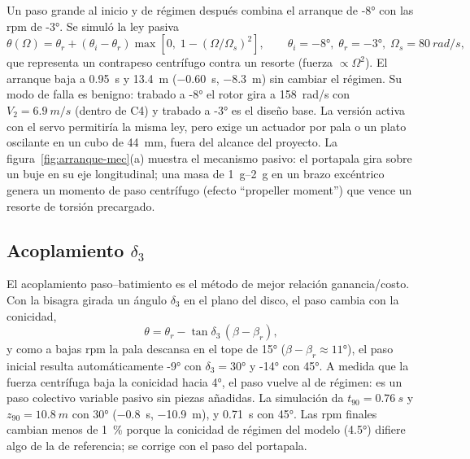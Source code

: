 Un paso grande al inicio y de régimen después combina el arranque de \ang{-8} con las rpm de
\ang{-3}. Se simuló la ley pasiva
\begin{equation}
  \theta(\Omega)=\theta_r+(\theta_i-\theta_r)\max\!\left[0,\;1-(\Omega/\Omega_s)^2\right],
  \qquad \theta_i=\ang{-8},\;\theta_r=\ang{-3},\;\Omega_s=\SI{80}{rad/s},
  \label{eq:arranque-var}
\end{equation}
que representa un contrapeso centrífugo contra un resorte (fuerza $\propto\Omega^2$). El
arranque baja a \SI{0.95}{s} y \SI{13.4}{m} (\SI{-0.60}{s}, \SI{-8.3}{m}) sin cambiar el
régimen. Su modo de falla es benigno: trabado a \ang{-8} el rotor gira a \SI{158}{rad/s} con
$V_2=\SI{6.9}{m/s}$ (dentro de C4) y trabado a \ang{-3} es el diseño base. La versión activa
con el servo permitiría la misma ley, pero exige un actuador por pala o un plato oscilante en
un cubo de \SI{44}{mm}, fuera del alcance del proyecto. La figura~\ref{fig:arranque-mec}(a)
muestra el mecanismo pasivo: el portapala gira sobre un buje en su eje longitudinal; una
masa de \SIrange{1}{2}{g} en un brazo excéntrico genera un momento de paso centrífugo
(efecto ``propeller moment'') que vence un resorte de torsión precargado.

\subsection{Acoplamiento \texorpdfstring{$\delta_3$}{delta-3}}\label{sec:arranque-d3}

El acoplamiento paso--batimiento es el método de mejor relación ganancia/costo. Con la bisagra
girada un ángulo $\delta_3$ en el plano del disco, el paso cambia con la conicidad,
\begin{equation}
  \theta=\theta_r-\tan\delta_3\,(\beta-\beta_r),
  \label{eq:arranque-d3}
\end{equation}
y como a bajas rpm la pala descansa en el tope de \ang{15} ($\beta-\beta_r\approx\ang{11}$), el
paso inicial resulta automáticamente \ang{-9} con $\delta_3=\ang{30}$ y \ang{-14} con
\ang{45}. A medida que la fuerza centrífuga baja la conicidad hacia \ang{4}, el paso vuelve
al de régimen: es un paso colectivo variable pasivo sin piezas añadidas. La simulación da
$t_{90}=\SI{0.76}{s}$ y $z_{90}=\SI{10.8}{m}$ con \ang{30} (\SI{-0.8}{s}, \SI{-10.9}{m}), y
\SI{0.71}{s} con \ang{45}. Las rpm finales cambian menos de \SI{1}{\percent} porque la
conicidad de régimen del modelo (\ang{4.5}) difiere algo de la de referencia; se corrige con
el paso del portapala.

